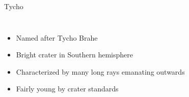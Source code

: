 \documentclass[pdf, aspectratio=169]{beamer}
\begin{document}
\begin{frame}{Tycho}
	\begin{columns}
		\begin{itemize}
			\item Named after Tycho Brahe
			\item Bright crater in Southern hemisphere
			\item Characterized by many long rays emanating outwards
			\item Fairly young by crater standards
		\end{itemize}
		\begin{center}
		\end{center}
	\end{columns}
\end{frame}
\end{document}
